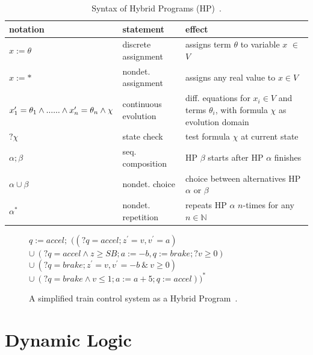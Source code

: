 \begin{table}
	\begin{tabular}{p{5cm} | p{4cm} | p{6cm} }
		notation & statement & effect \\ \hline
		\(x := \theta\) & discrete assignment & assigns term \(\theta\) to variable \(x\) \(\in\) \(V\) \\
		\(x := \ast\) & nondet. assignment & assigns any real value to \(x \in V\) \\
		\(x^{\prime}_1 = \theta_1 \wedge ... \newline
		... \wedge x^{\prime}_n = \theta_n \wedge \chi\) & continuous evolution & diff. equations for \(x_i \in V\) and terms \(\theta_i\),\newline
		with formula \(\chi\) as evolution domain \\
		\(?\chi\) & state check & test formula \(\chi\) at current state \\
		\(\alpha;\beta\) & seq. composition & HP \(\beta\) starts after HP \(\alpha\) finishes \\
		\(\alpha \cup \beta\) & nondet. choice & choice between alternatives HP \(\alpha\) or \(\beta\) \\
		\(\alpha^\ast\) & nondet. repetition & repeats HP \(\alpha\) \(n\)-times for any \(n \in \mathbb{N}\) \\
	\end{tabular}
	\caption{Syntax of Hybrid Programs (HP)~\cite{platzer2010b}.}
	\label{tab:hp}
\end{table}

\begin{figure}[ht!]
	\(q := accel;\)\newline
	\(((?q = accel; z^{\prime}= v, v^{\prime}= a)\) \newline
	\(\cup~(?q = accel \wedge z \geq SB; a := -b, q:= brake; ?v \geq 0)\) \newline
	\(\cup~(?q = brake; z^{\prime}=v, v^{\prime}= -b ~ \& ~ v \geq 0)\) \newline
	\(\cup~(?q = brake \wedge v \leq 1; a := a+5; q := accel))^\ast\)
	\caption{A simplified train control system as a Hybrid Program~\cite{platzer2010b}.}
	\label{fig:etcs_hp}
\end{figure}

\section{Dynamic Logic}
\label{sec:pre:DL}

